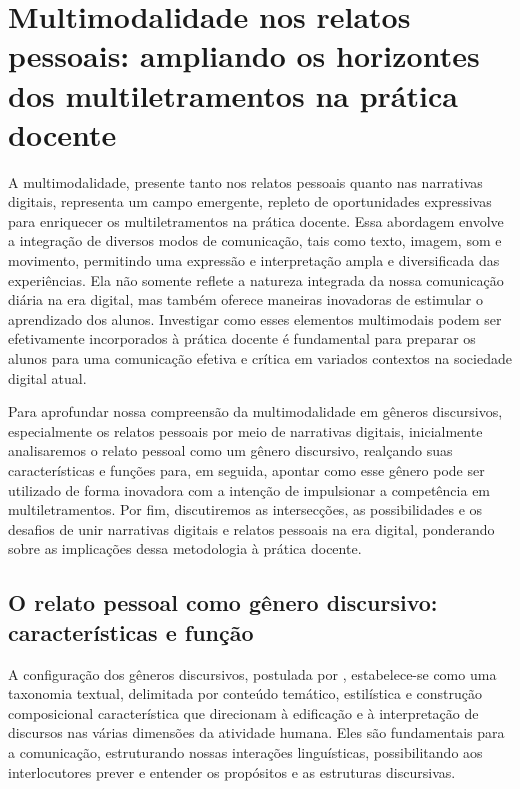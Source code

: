 \documentclass[portuguese]{textolivre}
\begin{document}
\section{Multimodalidade nos relatos pessoais: ampliando os horizontes dos multiletramentos na prática docente}

A multimodalidade, presente tanto nos relatos pessoais quanto nas narrativas digitais, representa um campo emergente, repleto de oportunidades expressivas para enriquecer os multiletramentos na prática docente. Essa abordagem envolve a integração de diversos modos de comunicação, tais como texto, imagem, som e movimento, permitindo uma expressão e interpretação ampla e diversificada das experiências. Ela não somente reflete a natureza integrada da nossa comunicação diária na era digital, mas também oferece maneiras inovadoras de estimular o aprendizado dos alunos. Investigar como esses elementos multimodais podem ser efetivamente incorporados à prática docente é fundamental para preparar os alunos para uma comunicação efetiva e crítica em variados contextos na sociedade digital atual.

Para aprofundar nossa compreensão da multimodalidade em gêneros discursivos, especialmente os relatos pessoais por meio de narrativas digitais, inicialmente analisaremos o relato pessoal como um gênero discursivo, realçando suas características e funções para, em seguida, apontar como esse gênero pode ser utilizado de forma inovadora com a intenção de impulsionar a competência em multiletramentos. Por fim, discutiremos as intersecções, as possibilidades e os desafios de unir narrativas digitais e relatos pessoais na era digital, ponderando sobre as implicações dessa metodologia à prática docente.



\subsection{O relato pessoal como gênero discursivo: características e função}

A configuração dos gêneros discursivos, postulada por \textcite{bakhtin}, estabelece-se como uma taxonomia textual, delimitada por conteúdo temático, estilística e construção composicional característica que direcionam à edificação e à interpretação de discursos nas várias dimensões da atividade humana. Eles são fundamentais para a comunicação, estruturando nossas interações linguísticas, possibilitando aos interlocutores prever e entender os propósitos e as estruturas discursivas.
\end{document}
